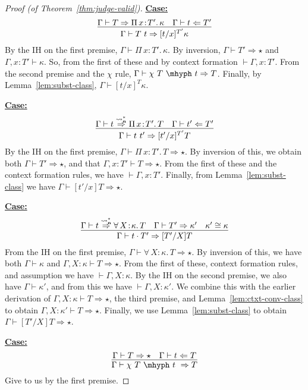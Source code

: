 \documentclass{article}
\newcommand{\abs}[4]{{#1}\, #2\! : \! #3.\, #4}
\newcommand{\leadstocs}[0]{\ensuremath{\leadsto_{\mathbf{n}}^*}}
\newcommand{\tpcheck}[0]{\Leftarrow}
\newcommand{\tpsynth}[0]{\Rightarrow}
\newcommand{\tpsynthleads}[0]{\ensuremath{\overset{\leadstocs}{\Rightarrow}}}
\newcommand{\startcase}[1]{\vspace{#1} \noindent\textbf{\underline{Case:}}}
\begin{document}
\begin{proof}[Proof (of Theorem~\ref{thm:judge-valid})]
  \startcase{.2cm}
  \[
    \infer{\Gamma\vdash T\ t \tpsynth [t/x]^{T'}\kappa}{\Gamma\vdash T \tpsynth \abs{\Pi}{x}{T'}{\kappa} & \Gamma\vdash t \tpcheck T'}
  \]
  By the IH on the first premise, \(\Gamma \vdash \abs{\Pi}{x}{T'}{\kappa}\).
  By inversion, \(\Gamma \vdash T' \tpsynth \star\) and \(\Gamma,x:T' \vdash
  \kappa\).
  So, from the first of these and by context formation \(\vdash \Gamma,x:T'\).
  From the second premise and the \(\chi\) rule, \(\Gamma \vdash \chi\ T\
  \mhyph\ t \tpsynth T\).
  Finally, by Lemma~\ref{lem:subst-class}, \(\Gamma \vdash [t/x]^{T} \kappa\).

  \startcase{.2cm}
  \[
    \infer{\Gamma\vdash t\ t' \tpsynth [t'/x]^{T'}T}{\Gamma\vdash t \tpsynthleads \abs{\Pi}{x}{T'}{T} & \Gamma\vdash t' \tpcheck T'}
  \]
  By the IH on the first premise, \(\Gamma \vdash \abs{\Pi}{x}{T'}{T} \tpsynth
  \star\).
  By inversion of this, we obtain both \(\Gamma \vdash T' \tpsynth \star\), and
  that \(\Gamma,x:T' \vdash T \tpsynth \star\).
  From the first of these and the context formation rules, we have \(\vdash
  \Gamma,x:T'\).
  Finally, from Lemma~\ref{lem:subst-class} we have \(\Gamma \vdash [t'/x]T
  \tpsynth \star\).

  \startcase{.2cm}
  \[
    \infer{
      \Gamma\vdash t \cdot T' \tpsynth [T'/X]T
    }{
      \Gamma\vdash t \tpsynthleads \abs{\forall}{X}{\kappa}{T} & \Gamma\vdash T'
      \tpsynth \kappa' & \kappa'\cong\kappa
    }
  \]
  From the IH on the first premise, \(\Gamma \vdash \abs{\forall}{X}{\kappa}{T}
  \tpsynth \star\).
  By inversion of this, we have both \(\Gamma \vdash \kappa\) and
  \(\Gamma,X:\kappa \vdash T \tpsynth \star\).
  From the first of these, context formation rules, and assumption we have
  \(\vdash \Gamma,X:\kappa\).
  By the IH on the second premise, we also have \(\Gamma \vdash \kappa'\), and
  from this we have \(\vdash \Gamma,X:\kappa'\).
  We combine this with the earlier derivation of \(\Gamma,X:\kappa \vdash T
  \tpsynth \star\), the third premise, and Lemma~\ref{lem:ctxt-conv-class} to
  obtain \(\Gamma,X:\kappa' \vdash T \tpsynth \star\).
  Finally, we use Lemma~\ref{lem:subst-class} to obtain \(\Gamma \vdash [T'/X]T
  \tpsynth \star\).
  



  \startcase{.2cm}
  \[
    \infer{\Gamma \vdash \chi\ T\ \mhyph\ t\ \tpsynth T}
    {\Gamma \vdash T \tpsynth \star & \Gamma \vdash t \tpcheck T}
  \]
  Give to us by the first premise.
\end{proof}
\end{document}

